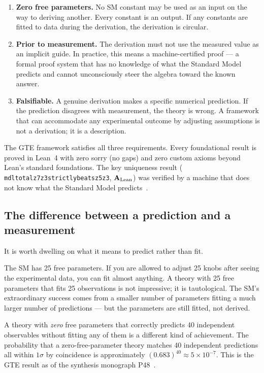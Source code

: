 \documentclass[11pt,a4paper]{article}
\newcommand{\lean}[1]{%
  \penalty-100
  \begingroup\def\_{\textunderscore\allowbreak}\texttt{#1}\endgroup}
\newcommand{\CatAL}{\ensuremath{\mathbf{A}_{\rm Lean}}}
\begin{document}
\begin{enumerate}[itemsep=4pt]
  \item \textbf{Zero free parameters.}
        No SM constant may be used as an input on the way to deriving another.
        Every constant is an output.
        If any constants are fitted to data during the derivation, the derivation
        is circular.

  \item \textbf{Prior to measurement.}
        The derivation must not use the measured value as an implicit guide.
        In practice, this means a machine-certified proof --- a formal proof
        system that has no knowledge of what the Standard Model predicts
        and cannot unconsciously steer the algebra toward the known answer.

  \item \textbf{Falsifiable.}
        A genuine derivation makes a specific numerical prediction.
        If the prediction disagrees with measurement, the theory is wrong.
        A framework that can accommodate any experimental outcome by adjusting
        assumptions is not a derivation; it is a description.
\end{enumerate}

The GTE framework satisfies all three requirements.
Every foundational result is proved in Lean~4 with zero sorry (no gaps) and
zero custom axioms beyond Lean's standard foundations.
The key uniqueness result
(\lean{mdl\_total\_z7z3\_strictly\_beats\_z5z3}, \CatAL)
was verified by a machine that does not know what the Standard Model
predicts~\cite{SpivackGTECompleteFramework}.

\subsection{The difference between a prediction and a measurement}

It is worth dwelling on what it means to predict rather than fit.

The SM has 25 free parameters.
If you are allowed to adjust 25 knobs after seeing the experimental data,
you can fit almost anything.
A theory with 25 free parameters that fits 25 observations is not impressive;
it is tautological.
The SM's extraordinary success comes from a smaller number of parameters
fitting a much larger number of predictions --- but the parameters are
still fitted, not derived.

A theory with \emph{zero} free parameters that correctly predicts 40
independent observables without fitting any of them is a different kind
of achievement.
The probability that a zero-free-parameter theory matches 40 independent
predictions all within $1\sigma$ by coincidence is approximately
$(0.683)^{40} \approx 5 \times 10^{-7}$.
This is the GTE result as of the synthesis monograph P48~\cite{SpivackGTECompleteFramework}.
\end{document}
